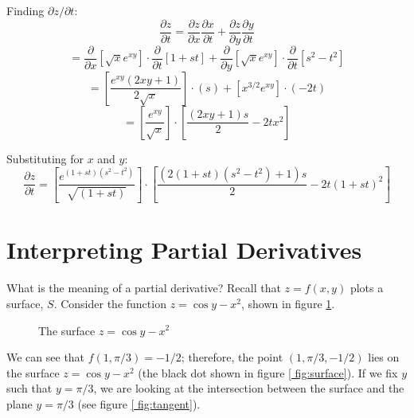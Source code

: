\begin{Answer}[ref = chain]
\begin{enumerate}
    Finding $\partial z / \partial t$:
    $$\frac{\partial z}{\partial t} = \frac{\partial z}{\partial x} \frac{
    \partial x}{\partial t} + \frac{\partial z}{\partial y}\frac{\partial y}{
    \partial t}$$
    $$= \frac{\partial}{\partial x} \left[ \sqrt{x}e^{xy} \right] \cdot \frac{
    \partial}{\partial t} \left[ 1 + st \right] + \frac{\partial}{\partial y} 
    \left[ \sqrt{x}e^{xy} \right] \cdot \frac{\partial}{\partial t} \left[ s^2 
    - t^2 \right]$$
    $$= \left[ \frac{e^{xy} \left( 2xy + 1 \right)}{2\sqrt{x}} \right] \cdot 
    \left( s \right) + \left[ x^{3/2}e^{xy} \right] \cdot \left( -2t \right)$$
    $$= \left[ \frac{e^{xy}}{\sqrt{x}} \right] \cdot \left[ \frac{\left( 2xy + 
    1 \right)s}{2} - 2tx^2 \right]$$

    Substituting for $x$ and $y$:
    $$\frac{\partial z}{\partial t} = \left[ \frac{e^{\left( 1 + st \right) 
    \left( s^2 - t^2 \right)}}{\sqrt{\left( 1 + st \right)}} \right] \cdot 
    \left[ \frac{\left( 2\left( 1 + st \right) \left( s^2 - t^2 \right) + 1 
    \right)s}{2} - 2t \left( 1 + st \right)^2 \right]$$
\end{enumerate}
\end{Answer}

\section{Interpreting Partial Derivatives}
What is the meaning of a partial derivative? Recall that $z = f(x, y)$ plots a 
surface, $S$. Consider the function $z = \cos{y} - x^2$, shown in figure 
\ref{fig:surface}.

\begin{figure}[H]
    \centering
    \caption{The surface $z = \cos{y} - x^2$}
    \label{fig:surface}
\end{figure}

We can see that $f(1, \pi/3) = -1/2$; therefore, the point $(1, \pi/3, -1/2)$ 
lies on the surface $z = \cos{y} - x^2$ (the black dot shown in figure \ref{
fig:surface}). If we fix $y$ such that $y = \pi/3$, we are looking at the 
intersection between the surface and the plane $y = \pi/3$ (see figure \ref{
fig:tangent}). 

